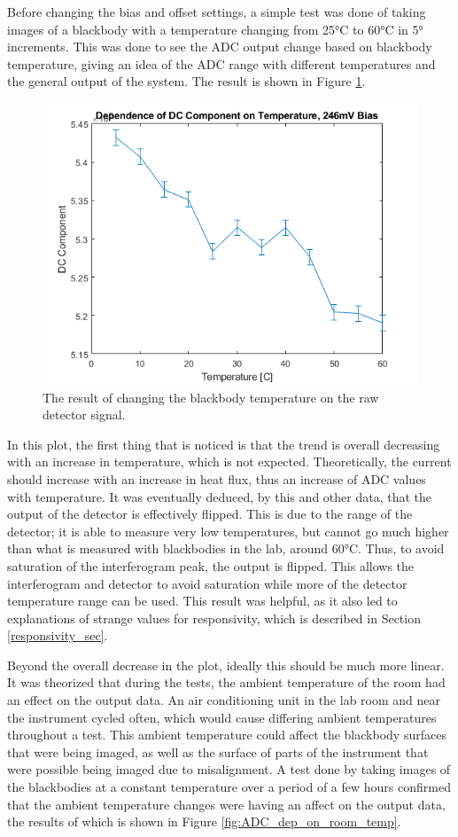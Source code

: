 Before changing the bias and offset settings, a simple test was done of taking images of a blackbody with a temperature changing from 25°C to 60°C in 5° increments. This was done to see the ADC output change based on blackbody temperature, giving an idea of the ADC range with different temperatures and the general output of the system. The result is shown in Figure \ref{fig:ADC_dep_on_bb_temp}.

\begin{figure}[h]
  \centering
  \includegraphics[width=0.8\linewidth]{chap5_images/DC_dep_on_temp.png}
  \caption{The result of changing the blackbody temperature on the raw detector signal.}
  \label{fig:ADC_dep_on_bb_temp}
\end{figure}

In this plot, the first thing that is noticed is that the trend is overall decreasing with an increase in temperature, which is not expected. Theoretically, the current should increase with an increase in heat flux, thus an increase of ADC values with temperature. It was eventually deduced, by this and other data, that the output of the detector is effectively flipped. This is due to the range of the detector; it is able to measure very low temperatures, but cannot go much higher than what is measured with blackbodies in the lab, around 60°C. Thus, to avoid saturation of the interferogram peak, the output is flipped. This allows the interferogram and detector to avoid saturation while more of the detector temperature range can be used. This result was helpful, as it also led to explanations of strange values for responsivity, which is described in Section \ref{responsivity_sec}.

Beyond the overall decrease in the plot, ideally this should be much more linear. It was theorized that during the tests, the ambient temperature of the room had an effect on the output data. An air conditioning unit in the lab room and near the instrument cycled often, which would cause differing ambient temperatures throughout a test. This ambient temperature could affect the blackbody surfaces that were being imaged, as well as the surface of parts of the instrument that were possible being imaged due to misalignment. A test done by taking images of the blackbodies at a constant temperature over a period of a few hours confirmed that the ambient temperature changes were having an affect on the output data, the results of which is shown in Figure \ref{fig:ADC_dep_on_room_temp}.

